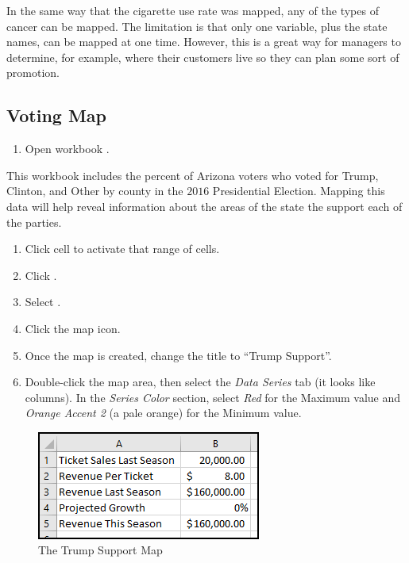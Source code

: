 In the same way that the cigarette use rate was mapped, any of the types of cancer can be mapped. The limitation is that only one variable, plus the state names, can be mapped at one time. However, this is a great way for managers to determine, for example, where their customers live so they can plan some sort of promotion.


\subsection{Voting Map}

\begin{enumerate}
	\item Open workbook .
\end{enumerate}

This workbook includes the percent of Arizona voters who voted for Trump, Clinton, and Other by county in the $ 2016 $ Presidential Election. Mapping this data will help reveal information about the areas of the state the support each of the parties.

\begin{enumerate}[resume]
	\item Click cell  to activate that range of cells.
	\item Click .
	\item Select .
	\item Click the map icon.
	\item Once the map is created, change the title to ``Trump Support''.
	\item Double-click the map area, then select the \textit{Data Series} tab (it looks like columns). In the \textit{Series Color} section, select \textit{Red} for the Maximum value and \textit{Orange Accent 2} (a pale orange) for the Minimum value. 
\end{enumerate}

\begin{figure}[H]
	\centering
	\includegraphics[width=\maxwidth{.95\linewidth}]{gfx/ch08_fig40}
	\caption{The Trump Support Map}
	\label{08:fig40}
\end{figure}

